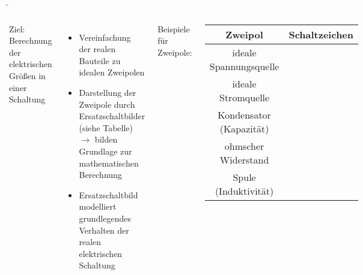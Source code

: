 \begin{frame}

	\b{
		\begin{columns}
			
			Ziel: Berechnung der elektrischen Größen in einer Schaltung
			
			\vspace{5pt}
			\begin{itemize}
				\item Vereinfachung der realen Bauteile zu idealen Zweipolen
				\item Darstellung der Zweipole durch Ersatzschaltbilder (siehe Tabelle)\\
				      $\rightarrow$ bilden Grundlage zur mathematischen Berechnung		
				\item Ersatzschaltbild modelliert grundlegendes Verhalten der realen elektrischen Schaltung
				      
			\end{itemize}
			
			
			Beispiele für Zweipole:
			
			
			\begin{center}
				\begin{tabular}{|c|c|}
					\hline
					Zweipol                 & Schaltzeichen                                               \\ \hline
					ideale Spannungsquelle  &  \\ \hline
					ideale Stromquelle      &      \\ \hline
					Kondensator (Kapazität) &             \\ \hline
					ohmscher Widerstand     &     \\ \hline
					Spule (Induktivität)    &                   \\ \hline
				\end{tabular}
			\end{center}
		\end{columns}
		
}
\end{frame}
